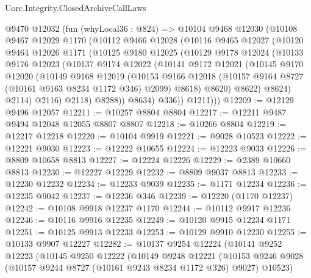 \begin{lexlean}{Uorc.Integrity.ClosedArchiveCallLaws}
\begin{coremodule}
        @9470
        @12032
        (fun (whyLocal36 : @824) =>
        @10104
          @9468
          @12030
          (@10108
            @9467
            @12029
            @1170
            (@10112
              @9466
              @12028
              (@10116
                @9465
                @12027
                (@10120
                  @9464
                  @12026
                  @1171
                  (@10125
                    @9180
                    @12025
                    (@10129
                      @9178
                      @12024
                      (@10133
                        @9176
                        @12023
                        (@10137
                          @9174
                          @12022
                          (@10141
                            @9172
                            @12021
                            (@10145
                              @9170
                              @12020
                              (@10149
                                @9168
                                @12019
                                (@10153
                                  @9166
                                  @12018
                                  (@10157 @9164 @8727 (@10161 @9163 @8234 @1172 @346) @2099)
                                  @8618)
                                @8620)
                              @8622)
                            @8624)
                          @2114)
                        @2116)
                      @2118)
                    @8288))
                @8634)
              @336))
          @1211)))
@12209 := @12129 @9496 @12057
@12211 := @10257 @8804 @8804
@12217 := @12211 @9487 @9494 @12048 @12055 @8807 @8807
@12218 := @10266 @8804
@12219 := @12217 @12218
@12220 := @10104 @9919
@12221 := @9028 @10523
@12222 := @12221 @9030
@12223 := @12222 @10655
@12224 := @12223 @9033
@12226 := @8809 @10658 @8813
@12227 := @12224 @12226
@12229 := @2389 @10660 @8813
@12230 := @12227 @12229
@12232 := @8809 @9037 @8813
@12233 := @12230 @12232
@12234 := @12233 @9039
@12235 := @1171 @12234
@12236 := @12235 @9042
@12237 := @12236 @346
@12239 := @12220 (@1170 @12237)
@12242 := @10108 @9918 @12237 @1170
@12244 := @10112 @9917 @12236
@12246 := @10116 @9916 @12235
@12249 := @10120 @9915 @12234 @1171
@12251 := @10125 @9913 @12233
@12253 := @10129 @9910 @12230
@12255 := @10133 @9907 @12227
@12282 := @10137
    @9254
    @12224
    (@10141
      @9252
      @12223
      (@10145
        @9250
        @12222
        (@10149
          @9248
          @12221
          (@10153 @9246 @9028 (@10157 @9244 @8727 (@10161 @9243 @8234 @1172 @326) @9027) @10523)

\end{coremodule}
\end{lexlean}
